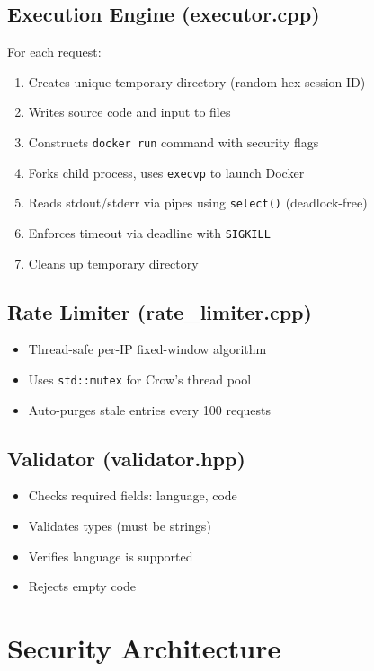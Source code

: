 \documentclass[12pt,a4paper]{report}
\begin{document}
\subsection{Execution Engine (executor.cpp)}
For each request:
\begin{enumerate}
    \item Creates unique temporary directory (random hex session ID)
    \item Writes source code and input to files
    \item Constructs \texttt{docker run} command with security flags
    \item Forks child process, uses \texttt{execvp} to launch Docker
    \item Reads stdout/stderr via pipes using \texttt{select()} (deadlock-free)
    \item Enforces timeout via deadline with \texttt{SIGKILL}
    \item Cleans up temporary directory
\end{enumerate}

\subsection{Rate Limiter (rate\_limiter.cpp)}
\begin{itemize}
    \item Thread-safe per-IP fixed-window algorithm
    \item Uses \texttt{std::mutex} for Crow's thread pool
    \item Auto-purges stale entries every 100 requests
\end{itemize}

\subsection{Validator (validator.hpp)}
\begin{itemize}
    \item Checks required fields: language, code
    \item Validates types (must be strings)
    \item Verifies language is supported
    \item Rejects empty code
\end{itemize}

\section{Security Architecture}
\end{document}
